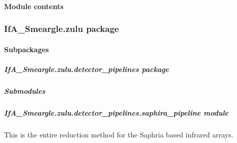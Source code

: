 \documentclass[letterpaper,10pt,english]{sphinxmanual}
\begin{document}
\paragraph{Module contents}
\label{\detokenize{python_docstrings/IfA_Smeargle.yankee:module-IfA_Smeargle.yankee}}\label{\detokenize{python_docstrings/IfA_Smeargle.yankee:module-contents}}

\subsubsection{IfA\_Smeargle.zulu package}
\label{\detokenize{python_docstrings/IfA_Smeargle.zulu:ifa-smeargle-zulu-package}}\label{\detokenize{python_docstrings/IfA_Smeargle.zulu::doc}}

\paragraph{Subpackages}
\label{\detokenize{python_docstrings/IfA_Smeargle.zulu:subpackages}}

\subparagraph{IfA\_Smeargle.zulu.detector\_pipelines package}
\label{\detokenize{python_docstrings/IfA_Smeargle.zulu.detector_pipelines:ifa-smeargle-zulu-detector-pipelines-package}}\label{\detokenize{python_docstrings/IfA_Smeargle.zulu.detector_pipelines::doc}}

\subparagraph{Submodules}
\label{\detokenize{python_docstrings/IfA_Smeargle.zulu.detector_pipelines:submodules}}

\subparagraph{IfA\_Smeargle.zulu.detector\_pipelines.saphira\_pipeline module}
\label{\detokenize{python_docstrings/IfA_Smeargle.zulu.detector_pipelines.saphira_pipeline:module-IfA_Smeargle.zulu.detector_pipelines.saphira_pipeline}}\label{\detokenize{python_docstrings/IfA_Smeargle.zulu.detector_pipelines.saphira_pipeline:ifa-smeargle-zulu-detector-pipelines-saphira-pipeline-module}}\label{\detokenize{python_docstrings/IfA_Smeargle.zulu.detector_pipelines.saphira_pipeline::doc}}
This is the entire reduction method for the Saphria based infrared arrays.
\end{document}
